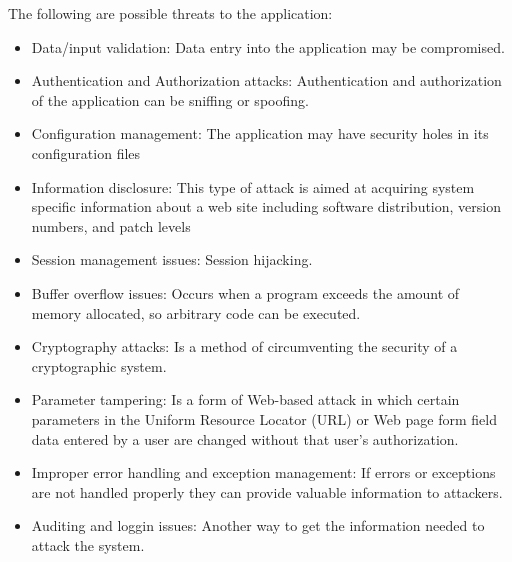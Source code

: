\begin{enumerate}
\begin{enumerate}
		The following are possible threats to the application:
		\begin{itemize}
			\item Data/input validation: Data entry into the application may be compromised.
			\item Authentication and Authorization attacks: Authentication and authorization of the application can be sniffing or spoofing.
			\item Configuration management: The application may have security holes in its configuration files
			\item Information disclosure: This type of attack is aimed at acquiring system specific information about a web site including software distribution, version numbers, and patch levels
			\item Session management issues: Session hijacking.
			\item Buffer overflow issues: Occurs when a program exceeds the amount of memory allocated, so arbitrary code can be executed.
			\item Cryptography attacks: Is a method of circumventing the security of a cryptographic system.
			\item Parameter tampering: Is a form of Web-based attack in which certain parameters in the Uniform Resource Locator (URL) or Web page form field data entered by a user are changed without that user's authorization.
			\item Improper error handling and exception management: If errors or exceptions are not handled properly they can provide valuable information to attackers.
			\item Auditing and loggin issues: Another way to get the information needed to attack the system.
		\end{itemize}
	\end{enumerate}
\end{enumerate}


